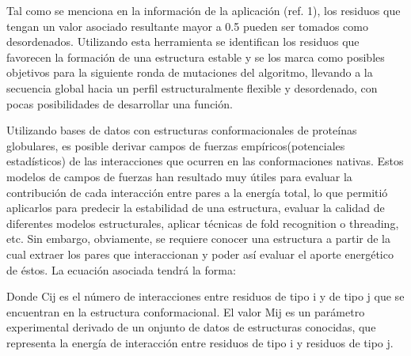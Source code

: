 Tal como se menciona en la información de la aplicación (ref. 1), los residuos que tengan un valor asociado resultante mayor a 0.5 pueden ser tomados como desordenados.
Utilizando esta herramienta se identifican los residuos que favorecen la formación de una estructura estable 
y se los marca como posibles objetivos para la siguiente ronda de mutaciones del algoritmo, llevando a la secuencia 
global hacia un perfil estructuralmente flexible y desordenado, con pocas posibilidades de desarrollar una función.


Utilizando bases de datos con estructuras conformacionales de proteínas globulares, 
es posible derivar campos de fuerzas empíricos(potenciales estadísticos) de las interacciones que ocurren en las conformaciones nativas. 
Estos modelos de campos de fuerzas han resultado muy útiles para evaluar la contribución de cada interacción entre pares a la energía total,
lo que permitió aplicarlos para predecir la estabilidad de una estructura, evaluar la calidad de diferentes modelos estructurales, aplicar técnicas de fold recognition o threading, etc. 
Sin embargo, obviamente, se requiere conocer una estructura a partir de la cual extraer los pares que interaccionan y poder así evaluar el aporte energético de éstos. 
La ecuación asociada tendrá la forma:





Donde Cij es el número de interacciones entre residuos de tipo i y de tipo j que se encuentran en la estructura conformacional. 
El valor Mij es un parámetro experimental derivado de un onjunto de datos de estructuras conocidas, que representa la energía de interacción entre residuos de tipo i y residuos de tipo j.

